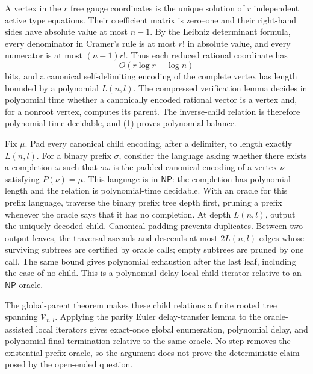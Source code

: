 A vertex in the \(r\) free gauge coordinates is the unique solution of \(r\) independent active type equations. Their coefficient matrix is zero--one and their right-hand sides have absolute value at most \(n-1\). By the Leibniz determinant formula, every denominator in Cramer's rule is at most \(r!\) in absolute value, and every numerator is at most \((n-1)r!\). Thus each reduced rational coordinate has
\[O(r\log r+\log n)\tag{1}\]
bits, and a canonical self-delimiting encoding of the complete vertex has length bounded by a polynomial \(L(n,l)\). The compressed verification lemma decides in polynomial time whether a canonically encoded rational vector is a vertex and, for a nonroot vertex, computes its parent. The inverse-child relation is therefore polynomial-time decidable, and (1) proves polynomial balance.

Fix \(\mu\). Pad every canonical child encoding, after a delimiter, to length exactly \(L(n,l)\). For a binary prefix \(\sigma\), consider the language asking whether there exists a completion \(\omega\) such that \(\sigma\omega\) is the padded canonical encoding of a vertex \(\nu\) satisfying \(P(\nu)=\mu\). This language is in \(\mathsf{NP}\): the completion has polynomial length and the relation is polynomial-time decidable. With an oracle for this prefix language, traverse the binary prefix tree depth first, pruning a prefix whenever the oracle says that it has no completion. At depth \(L(n,l)\), output the uniquely decoded child. Canonical padding prevents duplicates. Between two output leaves, the traversal ascends and descends at most \(2L(n,l)\) edges whose surviving subtrees are certified by oracle calls; empty subtrees are pruned by one call. The same bound gives polynomial exhaustion after the last leaf, including the case of no child. This is a polynomial-delay local child iterator relative to an \(\mathsf{NP}\) oracle.

The global-parent theorem makes these child relations a finite rooted tree spanning \(\mathcal V_{n,l}\). Applying the parity Euler delay-transfer lemma to the oracle-assisted local iterators gives exact-once global enumeration, polynomial delay, and polynomial final termination relative to the same oracle. No step removes the existential prefix oracle, so the argument does not prove the deterministic claim posed by the open-ended question.